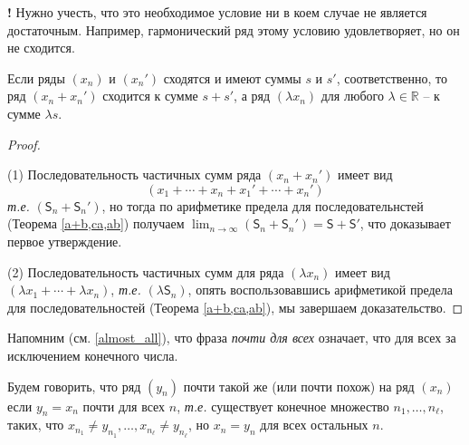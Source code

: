 \begin{mydanger}{\bf{!}}
    Нужно учесть, что это необходимое условие ни в коем случае не является достаточным. Например, гармонический ряд этому условию удовлетворяет, но он не сходится.
\end{mydanger}

\begin{proposition}\label{ariph_for_series}
    Если ряды $(x_n)$ и $(x_n')$ сходятся и имеют суммы $s$ и $s'$, соответственно, то ряд $(x_n+x_n')$ сходится к сумме $s+s'$, а ряд $(\lambda x_n)$ для любого $\lambda \in \mathbb{R}$ -- к сумме $\lambda s.$
\end{proposition}
\begin{proof}~

(1) Последовательность частичных сумм ряда $(x_n + x_n')$ имеет вид 
    \[
     (x_1 + \cdots + x_n + x_1' + \cdots +x_n')
    \]
\textit{т.е.} $(\mathsf{S}_n + \mathsf{S}_n')$, но тогда по арифметике предела для последовательнстей (Теорема \ref{a+b,ca,ab}) получаем $\lim_{n \to \infty} (\mathsf{S}_n + \mathsf{S}_n') = \mathsf{S}+ \mathsf{S}'$, что доказывает первое утверждение.

(2) Последовательность частичных сумм для ряда $(\lambda x_n)$ имеет вид $(\lambda x_1 + \cdots + \lambda x_n)$, \textit{т.е.} $(\lambda \mathsf{S}_n)$, опять воспользовавшись арифметикой предела для последовательностей (Теорема \ref{a+b,ca,ab}), мы завершаем доказательство.
\end{proof}

Напомним (см. \ref{almost_all}), что фраза \textit{почти для всех} означает, что для всех за исключением конечного числа.

\begin{definition}
    Будем говорить, что ряд $(y_n)$ почти такой же (или почти похож) на ряд $(x_n)$ если $y_n = x_n$ почти для всех $n$, \textit{т.е.} существует конечное множество $n_1,\ldots, n_\ell$, таких, что $x_{n_1} \ne y_{n_1},\ldots, x_{n_\ell} \ne y_{n_\ell}$, но $x_n = y_n$ для всех остальных $n.$
\end{definition}

